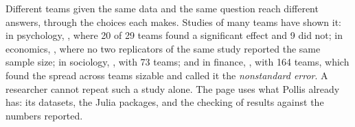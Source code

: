 Different teams given the same data and the same question reach different answers, through the choices each makes.
Studies of many teams have shown it: in psychology, , where
20 of 29 teams found a significant effect and 9 did not; in economics, , where no two replicators of the same study reported the same sample size; in sociology,
, with 73 teams; and in finance, , with 164 teams, which found the spread across teams sizable and called it the
\emph{nonstandard error}. A researcher cannot repeat such a study alone. The page uses what Pollis
already has: its datasets, the Julia packages, and the checking of results against the numbers reported.

